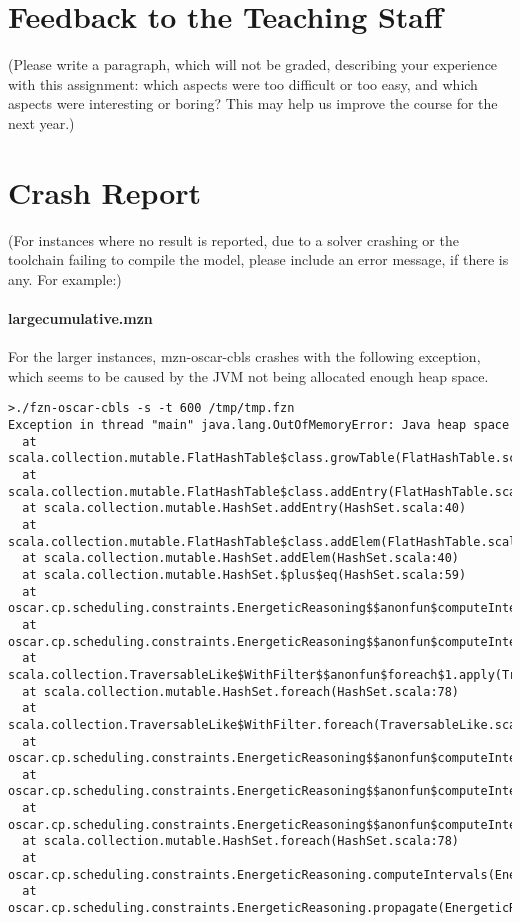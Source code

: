 \documentclass[a4paper,11pt]{article}
\begin{document}
\section*{Feedback to the Teaching Staff}

(Please write a paragraph, which will not be graded, describing your
experience with this assignment: which aspects were too difficult or
too easy, and which aspects were interesting or boring?  This may help
us improve the course for the next year.)

\section*{Crash Report}

(For instances where no result is reported, due to a solver crashing
or the \MiniZinc toolchain failing to compile the model, please
include an error message, if there is any.  For example:)

\paragraph{largecumulative.mzn} For the larger instances,
mzn-oscar-cbls crashes with the following exception, which seems to be
caused by the JVM not being allocated enough heap space.

{\tiny
\begin{verbatim}
>./fzn-oscar-cbls -s -t 600 /tmp/tmp.fzn
Exception in thread "main" java.lang.OutOfMemoryError: Java heap space
  at scala.collection.mutable.FlatHashTable$class.growTable(FlatHashTable.scala:217)
  at scala.collection.mutable.FlatHashTable$class.addEntry(FlatHashTable.scala:159)
  at scala.collection.mutable.HashSet.addEntry(HashSet.scala:40)
  at scala.collection.mutable.FlatHashTable$class.addElem(FlatHashTable.scala:139)
  at scala.collection.mutable.HashSet.addElem(HashSet.scala:40)
  at scala.collection.mutable.HashSet.$plus$eq(HashSet.scala:59)
  at oscar.cp.scheduling.constraints.EnergeticReasoning$$anonfun$computeIntervals$1$$anonfun$apply$mcVI$sp$2.apply(EnergeticReasoning.scala:127)
  at oscar.cp.scheduling.constraints.EnergeticReasoning$$anonfun$computeIntervals$1$$anonfun$apply$mcVI$sp$2.apply(EnergeticReasoning.scala:126)
  at scala.collection.TraversableLike$WithFilter$$anonfun$foreach$1.apply(TraversableLike.scala:778)
  at scala.collection.mutable.HashSet.foreach(HashSet.scala:78)
  at scala.collection.TraversableLike$WithFilter.foreach(TraversableLike.scala:777)
  at oscar.cp.scheduling.constraints.EnergeticReasoning$$anonfun$computeIntervals$1.apply$mcVI$sp(EnergeticReasoning.scala:126)
  at oscar.cp.scheduling.constraints.EnergeticReasoning$$anonfun$computeIntervals$1.apply(EnergeticReasoning.scala:126)
  at oscar.cp.scheduling.constraints.EnergeticReasoning$$anonfun$computeIntervals$1.apply(EnergeticReasoning.scala:126)
  at scala.collection.mutable.HashSet.foreach(HashSet.scala:78)
  at oscar.cp.scheduling.constraints.EnergeticReasoning.computeIntervals(EnergeticReasoning.scala:126)
  at oscar.cp.scheduling.constraints.EnergeticReasoning.propagate(EnergeticReasoning.scala:77)
\end{verbatim}
}

%




\end{document}
